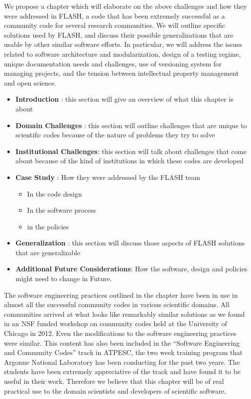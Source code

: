 \documentclass[11pt]{article}
\begin{document}
We propose a chapter which will elaborate on the above challenges and
how they were addressed in FLASH, a code that has been extremely
successful as a community code for several research communities. We
will outline specific solutions used by FLASH, and discuss their
possible generalizations that are usable by other similar software
efforts. In particular, we will address the issues related to software
architecture and modularization, design of a testing regime,
unique documentation needs and challenges, use of versioning system 
for managing projects, and the tension between intellectual property
management and open science. \\


\begin{itemize}
\item {\bf Introduction} : this section will give an overview of what
  this chapter is about
\vspace {-0.1in}
\item{\bf Domain Challenges} : this section will outline challenges
  that are unique to scientific codes because of the nature of
  problems they try to solve
\vspace {-0.1in}
\item {\bf Institutional Challenges}: this section will talk about
  challenges that come about because of the kind of institutions in
  which these codes are developed
\vspace {-0.1in}
\item {\bf Case Study} : How they were addressed by the FLASH team
\begin{itemize}
\vspace {-0.1in}
\item In the code design
\vspace {-0.1in}
\item In the software process
\vspace {-0.1in}
\item in the policies
\end{itemize}
\vspace {-0.1in}
\item{\bf Generalization} : this section will discuss those aspects of
  FLASH solutions that are generalizable
\vspace {-0.1in}
\item{\bf Additional Future Considerations}: How the software,
  design and policies might need to change in Future.
\end{itemize}

The software engineering practices outlined in the chapter have been
in use in almost all the successful community codes in various
scientific domains. All communities arrived at what looks like
remarkably similar solutions as we found in an NSF funded workshop on
community codes held at the University of Chicago in 2012. Even the
modifications to the software engineering practices were similar. This
content has also been included in the ``Software Engineering and
Community Codes'' track in ATPESC, the two week training program that Argonne National
Laboratory has been conducting for the past two years. The students
have been extremely appreciative of the track and have found it to be
useful in their work. Therefore we believe that this chapter will be
of real practical use to the domain scientists and developers of
scientific software.
\end{document}
